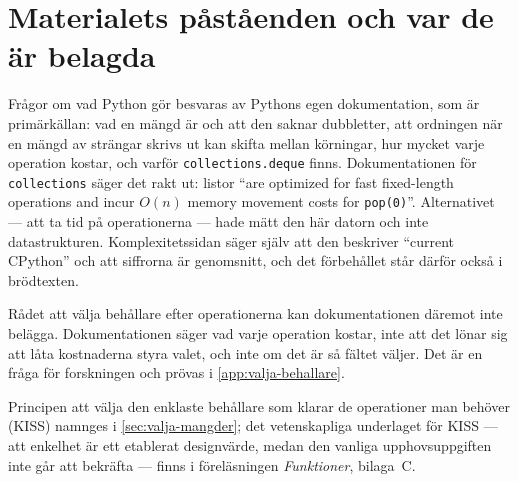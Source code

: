 \section{Materialets påståenden och var de är belagda}
\label{sec:mangder-pastaenden}

Frågor om vad Python gör besvaras av Pythons egen dokumentation, som är
primärkällan: vad en mängd är och att den saknar
dubbletter\autocite{PythonDataStructures}, att ordningen när en mängd
av strängar skrivs ut kan skifta mellan körningar\autocite{PythonDataModel},
hur mycket varje operation kostar\autocite{PythonTimeComplexity}, och
varför \texttt{collections.deque} finns\autocite{PythonCollections}.
Dokumentationen för \texttt{collections} säger det rakt
ut: listor \enquote{are optimized for fast
fixed-length operations and incur \(O(n)\) memory movement costs for
\texttt{pop(0)}}.  Alternativet --- att ta tid på
operationerna --- hade mätt den här datorn och inte datastrukturen.
Komplexitetssidan säger själv att den beskriver \enquote{current
CPython} och att siffrorna är genomsnitt, och det förbehållet står
därför också i brödtexten.

Rådet att välja behållare efter operationerna kan dokumentationen
däremot inte belägga.  Dokumentationen säger vad varje operation
kostar, inte att det lönar sig att låta kostnaderna styra valet, och
inte om det är så fältet väljer.  Det är en fråga för forskningen och
prövas i \cref{app:valja-behallare}.

Principen att välja den enklaste behållare som klarar de operationer man
behöver (\foreignlanguage{english}{KISS}) namnges i
\cref{sec:valja-mangder}; det vetenskapliga underlaget för
\foreignlanguage{english}{KISS} --- att enkelhet är ett etablerat
designvärde, medan den vanliga upphovsuppgiften inte går att bekräfta
--- finns i föreläsningen \emph{Funktioner}, bilaga~C.

\begingroup
\ifdefined\marginnotebesidefloats{}\fi
\marginheightadjustment=48pt
\renewcommand{\foottextfont}{\scriptsize\mpjustification}
